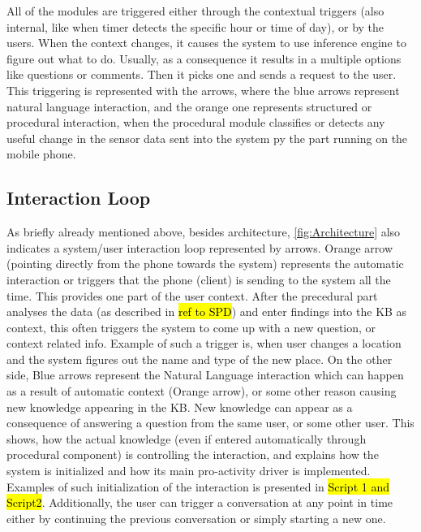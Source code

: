 All of the modules are triggered either through the contextual triggers 
(also internal, like when timer detects the specific hour or time of day), or
by the users. When the context changes, it causes the system to use inference
engine to figure out what to do. Usually, as a consequence it results in a 
multiple options like questions or comments. Then it picks one and sends a 
request to the user. This triggering is represented with the arrows, where the 
blue arrows represent natural language interaction, and the orange one
represents structured or procedural interaction, when the procedural module
classifies or detects any useful change in the sensor data sent into the system
py the part running on the mobile phone.

\subsection{Interaction Loop}
\label{section:interaction}
As briefly already mentioned above, besides architecture, 
\autoref{fig:Architecture} also indicates a system/user interaction loop 
represented by arrows. Orange arrow (pointing 
directly from the phone towards the system) represents the automatic interaction
or triggers that the phone (client) is sending to the system all the time. This
provides one part of the user context. After the precedural part analyses
the data (as described in \hl{ref to SPD}) and enter findings into the KB as 
context, this often triggers the system to come up with a new question, or 
context related info. Example of such a trigger is, when user changes a location
and the system figures out the name and type of the new place. On the other 
side, Blue arrows represent the Natural Language interaction which can happen
as a result of automatic context (Orange arrow), or some other reason causing new 
knowledge appearing in the KB. New knowledge can appear as a consequence of
answering a question from the same user, or some other user. This shows, how the
actual knowledge (even if entered automatically through procedural component) is
controlling the interaction, and explains how the system is initialized and how
its main pro-activity driver is implemented. Examples of such initialization
of the interaction is presented in \hl{Script 1 and Script2}. Additionally, the 
user can trigger a conversation at any point in time either by continuing the 
previous conversation or simply starting a new one. 

